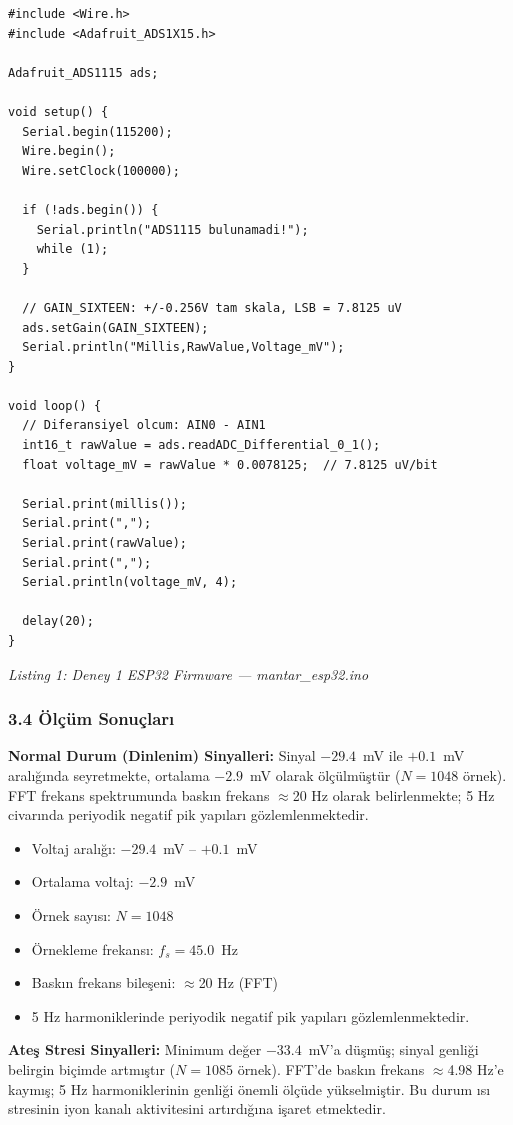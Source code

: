 \documentclass[11pt,a4paper]{article}
\begin{document}
\begin{verbatim}
#include <Wire.h>
#include <Adafruit_ADS1X15.h>

Adafruit_ADS1115 ads;

void setup() {
  Serial.begin(115200);
  Wire.begin();
  Wire.setClock(100000);

  if (!ads.begin()) {
    Serial.println("ADS1115 bulunamadi!");
    while (1);
  }

  // GAIN_SIXTEEN: +/-0.256V tam skala, LSB = 7.8125 uV
  ads.setGain(GAIN_SIXTEEN);
  Serial.println("Millis,RawValue,Voltage_mV");
}

void loop() {
  // Diferansiyel olcum: AIN0 - AIN1
  int16_t rawValue = ads.readADC_Differential_0_1();
  float voltage_mV = rawValue * 0.0078125;  // 7.8125 uV/bit

  Serial.print(millis());
  Serial.print(",");
  Serial.print(rawValue);
  Serial.print(",");
  Serial.println(voltage_mV, 4);

  delay(20);
}
\end{verbatim}
\textit{Listing 1: Deney 1 ESP32 Firmware --- mantar\_esp32.ino}

\subsubsection*{3.4 Ölçüm Sonuçları}

\textbf{Normal Durum (Dinlenim) Sinyalleri:} Sinyal $-29.4$~mV ile $+0.1$~mV aralığında seyretmekte, ortalama $-2.9$~mV olarak ölçülmüştür ($N=1048$ örnek). FFT frekans spektrumunda baskın frekans $\approx$20 Hz olarak belirlenmekte; 5 Hz civarında periyodik negatif pik yapıları gözlemlenmektedir.

\begin{itemize}[leftmargin=1cm]
  \item Voltaj aralığı: $-29.4$~mV -- $+0.1$~mV
  \item Ortalama voltaj: $-2.9$~mV
  \item Örnek sayısı: $N = 1048$
  \item Örnekleme frekansı: $f_s = 45.0$~Hz
  \item Baskın frekans bileşeni: $\approx$20 Hz (FFT)
  \item 5 Hz harmoniklerinde periyodik negatif pik yapıları gözlemlenmektedir.
\end{itemize}

\textbf{Ateş Stresi Sinyalleri:} Minimum değer $-33.4$~mV'a düşmüş; sinyal genliği belirgin biçimde artmıştır ($N=1085$ örnek). FFT'de baskın frekans $\approx$4.98 Hz'e kaymış; 5 Hz harmoniklerinin genliği önemli ölçüde yükselmiştir. Bu durum ısı stresinin iyon kanalı aktivitesini artırdığına işaret etmektedir.
\end{document}

